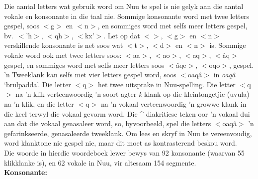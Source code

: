 Die aantal letters wat gebruik word om N\textipa{\textvertline}uu te
spel is nie gelyk aan die aantal vokale en konsonante in die taal nie.
Sommige konsonante word met twee letters gespel, soos
$<$g\textipa{\textdoublevertline}$>$ en
$<$n\textipa{\textdoublevertline}$>$, en sommiges word met selfs meer
letters gespel, bv.\ $<$\textipa{\textdoublevertline}'h$>$,
$<$\textipa{\textdoublevertline}qh$>$, $<$kx'$>$. Let op dat
$<$\textipa{\textdoublevertline}$>$,
$<$g\textipa{\textdoublevertline}$>$ en
$<$n\textipa{\textdoublevertline}$>$ verskillende konsonante is net
soos wat $<$t$>$, $<$d$>$ en $<$n$>$ is. Sommige vokale word ook met
twee letters soos: $<$aa$>$, $<$ao$>$, $<$aq$>$, $<$\^{a}q$>$ gespel,
en sommiges word met selfs meer letters soos $<$\^{a}qe$>$, $<$oqo$>$,
gespel. 'n Tweeklank kan selfs met vier letters gespel word, soos
$<$oaq\^{a}$>$ in \emph{\textipa{\textdoublevertline}oaq\^{a}}
`brulpadda'. Die letter $<$q$>$ het twee uitsprake in
N\textipa{\textvertline}uu-spelling. Die letter $<$q$>$ na 'n klik
verteenwoordig 'n soort agter-\emph{k} klank op die kleintongetjie
(uvula) na 'n klik, en die letter $<$q$>$ na 'n vokaal verteenwoordig
'n growwe klank in die keel terwyl die vokaal gevorm word. Die \^{ }
diakritiese teken oor 'n vokaal dui aan dat die vokaal genasaleer
word, so, byvoorbeeld, spel die letters $<$oaq\^{a}$>$ 'n
gefarinkseerde, genasaleerde tweeklank. Om lees en skryf in
N\textipa{\textvertline}uu te vereenvoudig, word klanktone nie gespel
nie, maar dit moet as kontrasterend beskou word.\\

Die woorde in hierdie woordeboek lewer bewys van 92 konsonante
(waarvan 55 klikklanke is), en 62 vokale in
N\textipa{\textvertline}uu, vir altesaam 154 segmente.\\

\textbf{Konsonante:}

